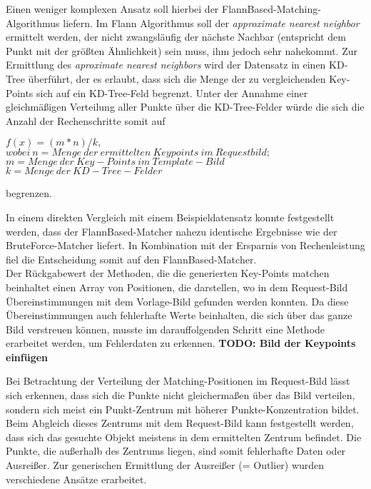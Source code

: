 \documentclass[
    type=Projektarbeit,
    status=draft, %
    language=german, %
    bibengine=bibtex,
]{unibwm-inf-thesis}
\newcommand{\todo}[1]{\textbf{TODO: #1}}
\begin{document}
    Einen weniger komplexen Ansatz soll hierbei der FlannBased-Matching-Algorithmus liefern.
    Im Flann Algorithmus soll der \textit{approximate nearest neighbor} ermittelt werden, der nicht zwangsläufig der nächste Nachbar (entspricht dem Punkt mit der größten Ähnlichkeit) sein muss,
    ihm jedoch sehr nahekommt.
    Zur Ermittlung des \textit{aproximate nearest neighbors} wird der Datensatz in einen KD-Tree überführt, der es erlaubt, dass sich die Menge der zu vergleichenden Key-Points sich auf ein KD-Tree-Feld begrenzt.
    Unter der Annahme einer gleichmäßigen Verteilung aller Punkte über die KD-Tree-Felder würde die sich die Anzahl der Rechenschritte somit auf
    \begin{center}
        $f(x) = (m*n) / k, $ \\
        $wobei~n= Menge~der~ermittelten~Keypoints~im~Requestbild;$\\
        $m = Menge~der~Key-Points~im~Template-Bild$\\
        $k = Menge~der~KD-Tree-Felder$\\
    \end{center}
    begrenzen.

    In einem direkten Vergleich mit einem Beispieldatensatz konnte festgestellt werden, dass der FlannBased-Matcher nahezu identische Ergebnisse wie der BruteForce-Matcher liefert.
    In Kombination mit der Ersparnis von Rechenleistung fiel die Entscheidung somit auf den FlannBased-Matcher.\\



    Der Rückgabewert der Methoden, die die generierten Key-Points matchen beinhaltet einen Array von Positionen, die darstellen, wo in dem Request-Bild Übereinstimmungen mit dem Vorlage-Bild gefunden werden konnten.
    Da diese Übereinstimmungen auch fehlerhafte Werte beinhalten, die sich über das ganze Bild verstreuen können, musste im darauffolgenden Schritt eine Methode erarbeitet werden, um Fehlerdaten zu erkennen.
    \todo{Bild der Keypoints einfügen}

    Bei Betrachtung der Verteilung der Matching-Positionen im Request-Bild lässt sich erkennen, dass sich die Punkte nicht gleichermaßen über das Bild verteilen, sondern sich meist ein Punkt-Zentrum mit höherer Punkte-Konzentration bildet.
    Beim Abgleich dieses Zentrums mit dem Request-Bild kann festgestellt werden, dass sich das gesuchte Objekt meistens in dem ermittelten Zentrum befindet.
    Die Punkte, die außerhalb des Zentrums liegen, sind somit fehlerhafte Daten oder Ausreißer.
    Zur generischen Ermittlung der Ausreißer (= Outlier) wurden verschiedene Ansätze erarbeitet.
\end{document}
